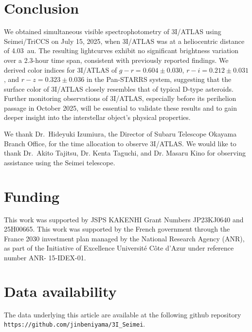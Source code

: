 \documentclass[]{pasj02}
\newcommand\gr{$g-r=0.604\pm0.030$\xspace}
\newcommand\ri{$r-i=0.212\pm0.031$\xspace}
\newcommand\rz{$r-z=0.323\pm0.036$\xspace}
\begin{document}
\section{Conclusion}\label{sec:conc}
We obtained simultaneous visible spectrophotometry of 3I/ATLAS using Seimei/TriCCS on July 15, 2025, when 3I/ATLAS was at a heliocentric distance of 4.03~au.
The resulting lightcurves exhibit no significant brightness variation over a 2.3-hour time span, consistent with previously reported findings.
We derived color indices for 3I/ATLAS of 
\gr, \ri, and \rz in the Pan-STARRS system,
suggesting that the surface color of 3I/ATLAS closely resembles that of typical D-type asteroids.
Further monitoring observations of 3I/ATLAS, 
especially before its perihelion passage in October 2025, will be essential to validate these results and to gain deeper insight into the interstellar object's physical properties.

\begin{ack}
We thank Dr.~Hideyuki Izumiura, the Director of Subaru Telescope Okayama Branch Office, 
for the time allocation to observe 3I/ATLAS.
We would like to thank Dr.~Akito Tajitsu, Dr. Kenta Taguchi, and Dr. Masaru Kino 
for observing assistance using the Seimei telescope.
\end{ack}

\section*{Funding}
This work was supported by JSPS KAKENHI Grant Numbers JP23KJ0640 and 25H00665. 
This work was supported by the French government through the France 2030 
investment plan managed by the National Research Agency (ANR), as part of the
Initiative of Excellence Université Côte d’Azur under reference number ANR- 15-IDEX-01.

\section*{Data availability} 
The data underlying this article are available at the following 
github repository \texttt{https://github.com/jinbeniyama/3I\_Seimei}.




\end{document}
